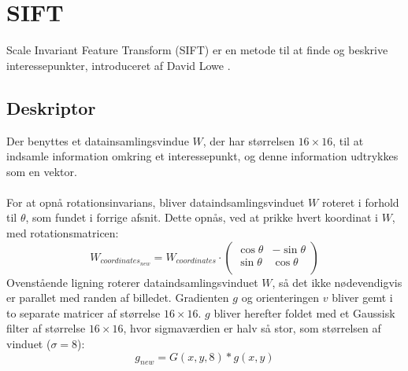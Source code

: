\section{SIFT}
Scale Invariant Feature Transform (SIFT) er en metode til at finde og beskrive interessepunkter, introduceret af David Lowe \cite{SIFT}.


\subsection{Deskriptor}
Der benyttes et datainsamlingsvindue $W$, der har størrelsen $16 \times 16$, til at indsamle information omkring et interessepunkt, og denne information udtrykkes som en vektor.
\\
\\
For at opnå rotationsinvarians, bliver dataindsamlingsvinduet $W$ roteret i forhold til $\theta$, som fundet i forrige afsnit. Dette opnås, ved at prikke hvert koordinat i $W$, med rotationsmatricen:
\begin{equation}
W_{coordinates_{new}} = W_{coordinates} \cdot
\begin{pmatrix}
  \cos \theta & -\sin \theta \\
  \sin \theta & \cos \theta  \\
\end{pmatrix}
\label{rotaionmatrix}
\end{equation}
Ovenstående ligning roterer dataindsamlingsvinduet $W$, så det ikke nødevendigvis er parallet med randen af billedet.
Gradienten $g$ og orienteringen $v$ bliver gemt i to separate matricer af størrelse $16\times16$. $g$ bliver herefter foldet med et Gaussisk filter af størrelse $16\times16$, hvor sigmaværdien er halv så stor, som størrelsen af vinduet ($\sigma=8$):
\begin{equation}
g_{new} = G(x,y,8) * g(x,y)
\label{gradientsmooth}
\end{equation}


